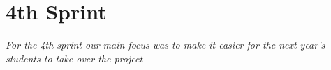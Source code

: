 \chapter{4th Sprint} \label{ChapSprint4}
\textit{For the 4th sprint our main focus was to make it easier for the next year's students to take over the project}




